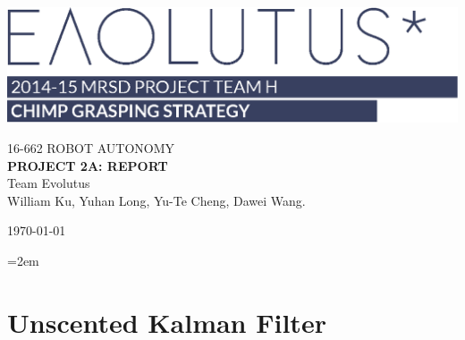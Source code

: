 \documentclass[letter, 10pt]{article}
\begin{document}
\begin{onehalfspacing}

\begin{titlepage}

	\noindent\includegraphics[scale = 0.4]{evolutus-with-text-blue.eps}
	\vspace{25\baselineskip}\vfill
	
	{\noindent\Large\uppercase{16-662 Robot Autonomy}\\[6pt]
	\Huge\uppercase{\bf Project 2A: Report}}\\[6pt]
	
	\noindent Team Evolutus \\
	\noindent William Ku, Yuhan Long, Yu-Te Cheng, Dawei Wang. \vspace{12pt}
	
	\noindent\today\vfill

\end{titlepage}

\pagestyle{fancy}

\setlength{\parskip}{0.5\baselineskip}
\RaggedRight
\parindent=2em

\newpage

\section{Unscented Kalman Filter}


\end{onehalfspacing}
\end{document}
